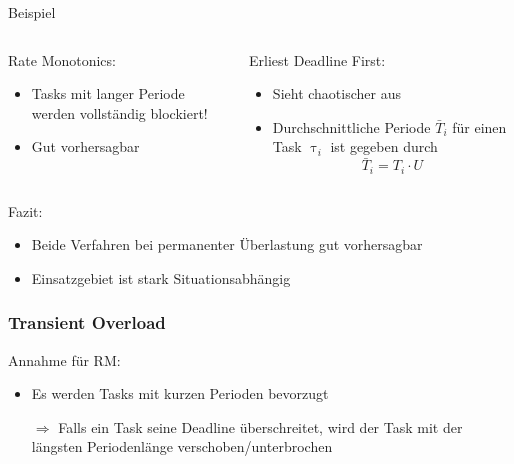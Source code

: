 \begin{frame}{Beispiel}
	
	
\end{frame}

\begin{frame}{\subsubsecname}
	\begin{columns}[]
  			\begin{column}{0.5\textwidth}
				Rate Monotonics:
				\begin{itemize}
					\item Tasks mit langer Periode werden vollständig blockiert!
					\item Gut vorhersagbar
				\end{itemize}

			\end{column}
  			\begin{column}{0.5\textwidth}
  				Erliest Deadline First:
				\begin{itemize}
					\item Sieht chaotischer aus
					\item Durchschnittliche Periode $\bar{T}_i$ für einen Task $\uptau_i$ ist gegeben durch
						\begin{equation}
							\bar{T}_i=T_i\cdot U
						\end{equation}
				\end{itemize}	
  			\end{column}
	\end{columns}
\end{frame}


\begin{frame}{\subsubsecname}
	Fazit:
	\begin{itemize}
		\item Beide Verfahren bei permanenter Überlastung gut vorhersagbar
		\item Einsatzgebiet ist stark Situationsabhängig
	\end{itemize}
\end{frame}

\subsubsection{Transient Overload}
\begin{frame}{\subsubsecname}
	Annahme für RM:
	\begin{itemize}
		\item Es werden Tasks mit kurzen Perioden bevorzugt\pause
		\item[$\Rightarrow$] Falls ein Task seine Deadline überschreitet, wird der Task mit der längsten Periodenlänge verschoben/unterbrochen	
	\end{itemize}
\end{frame}

